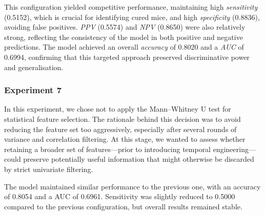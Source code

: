 \documentclass[12pt, a4paper]{report}
\begin{document}
This configuration yielded competitive performance, maintaining high \textit{sensitivity} (0.5152), which is crucial for identifying cured mice, and high \textit{specificity} (0.8836), avoiding false positives. \textit{PPV} (0.5574) and \textit{NPV} (0.8650) were also relatively strong, reflecting the consistency of the model in both positive and negative predictions. The model achieved an overall \textit{accuracy} of 0.8020 and a \textit{AUC} of 0.6994, confirming that this targeted approach preserved discriminative power and generalisation.

\begin{table}[H]
\centering
\renewcommand{\arraystretch}{1.5} %
\normalsize %
\caption{Configuration 6 - Lag Features with Heuristic}
\end{table}

\subsubsection{Experiment 7}

In this experiment, we chose not to apply the Mann–Whitney U test for statistical feature selection. The rationale behind this decision was to avoid reducing the feature set too aggressively, especially after several rounds of variance and correlation filtering. At this stage, we wanted to assess whether retaining a broader set of features—prior to introducing temporal engineering—could preserve potentially useful information that might otherwise be discarded by strict univariate filtering.

The model maintained similar performance to the previous one, with an accuracy of 0.8054 and a AUC of 0.6961. Sensitivity was slightly reduced to 0.5000 compared to the previous configuration, but overall results remained stable. 

\begin{table}[H]
\centering
\renewcommand{\arraystretch}{1.5} %
\normalsize %
\caption{Configuration 7 – No Mann–Whitney U test in feature selection}
\end{table}
\end{document}
